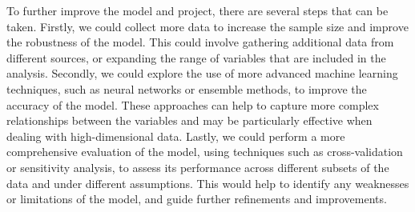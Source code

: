 \documentclass[final,5p,times,twocolumn,authoryear, 12pt]{elsarticle}
\begin{document}
To further improve the model and project, there are several steps that can be taken. Firstly, we could collect more data to increase the sample size and improve the robustness of the model. This could involve gathering additional data from different sources, or expanding the range of variables that are included in the analysis. Secondly, we could explore the use of more advanced machine learning techniques, such as neural networks or ensemble methods, to improve the accuracy of the model. These approaches can help to capture more complex relationships between the variables and may be particularly effective when dealing with high-dimensional data. Lastly, we could perform a more comprehensive evaluation of the model, using techniques such as cross-validation or sensitivity analysis, to assess its performance across different subsets of the data and under different assumptions. This would help to identify any weaknesses or limitations of the model, and guide further refinements and improvements.














\end{document}
